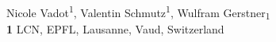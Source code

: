 \documentclass[10pt,letterpaper]{article}
\begin{document}
\vspace*{0.2in}

\begin{flushleft}
{\Large
\textbf{} %
}
\newline
\\
Nicole Vadot\textsuperscript{1},
Valentin Schmutz\textsuperscript{1},
Wulfram Gerstner\textsubscript{1}
\\
\bigskip
\textbf{1} LCN, EPFL, Lausanne, Vaud, Switzerland
\bigskip

% 
%






\end{flushleft}
\end{document}
